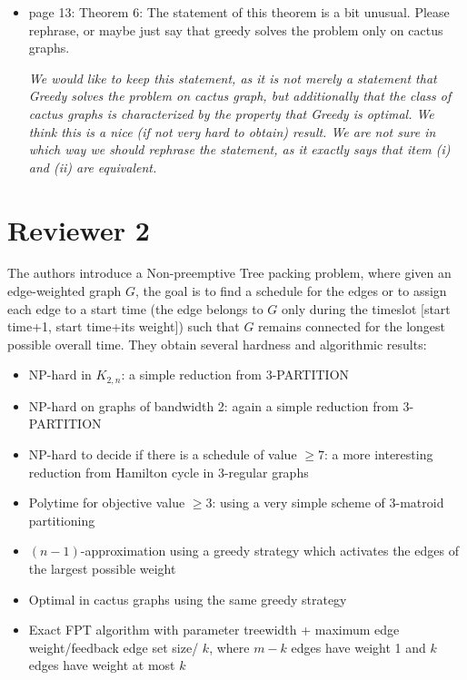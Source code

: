 \documentclass[11pt,a4paper]{article}
\begin{document}
\begin{itemize}
\item page 13: Theorem 6: The statement of this theorem is a bit unusual. Please rephrase, or maybe just say that greedy solves the problem only on cactus graphs.

\textit{We would like to keep this statement, as it is not merely a statement that Greedy solves the problem on cactus graph, but additionally that the class of cactus graphs is characterized by the property that Greedy is optimal. We think this is a nice (if not very hard to obtain) result. We are not sure in which way we should rephrase the statement, as it exactly says that item (i) and (ii) are equivalent.}

\end{itemize}


\section*{Reviewer 2}

The authors introduce a Non-preemptive Tree packing problem, where given an edge-weighted graph $G$, the goal is to find a schedule for the edges or to assign each edge to a start time (the edge belongs to $G$ only during the timeslot [start time+1, start time+its weight]) such that $G$ remains connected for the longest possible overall time. They obtain several hardness and algorithmic results:

\begin{itemize}
\item NP-hard in $K_{2,n}$: a simple reduction from 3-PARTITION
\item NP-hard on graphs of bandwidth 2: again a simple reduction from 3-PARTITION
\item NP-hard to decide if there is a schedule of value $\geq 7$: a more interesting reduction from Hamilton cycle in 3-regular graphs

\item Polytime for objective value $\geq 3$: using a very simple scheme of 3-matroid partitioning    
\item $(n-1)$-approximation using a greedy strategy which activates the edges of the largest possible weight
\item Optimal in cactus graphs using the same greedy strategy
\item Exact FPT algorithm with parameter treewidth + maximum edge weight/feedback edge set size/ $k$, where $m-k$ edges have weight 1 and $k$ edges have weight at most $k$
\end{itemize}
\end{document}
